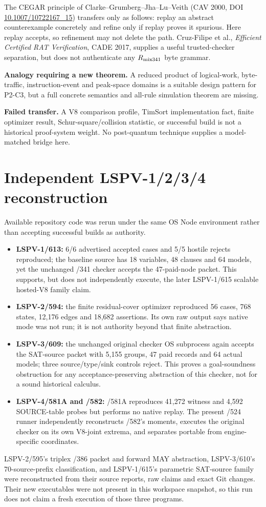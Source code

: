 \documentclass[11pt]{article}
\begin{document}
The CEGAR principle of Clarke--Grumberg--Jha--Lu--Veith (CAV 2000, DOI \href{https://doi.org/10.1007/10722167_15}{10.1007/10722167\_15}) transfers only as follows: replay an abstract counterexample concretely and refine only if replay proves it spurious.  Here replay accepts, so refinement may not delete the path.  Cruz-Filipe et al., \emph{Efficient Certified RAT Verification}, CADE 2017, supplies a useful trusted-checker separation, but does not authenticate any $R_{\rm mix341}$ byte grammar.

\textbf{Analogy requiring a new theorem.} A reduced product of logical-work, byte-traffic, instruction-event and peak-space domains is a suitable design pattern for P2-C3, but a full concrete semantics and all-rule simulation theorem are missing.

\textbf{Failed transfer.} A V8 comparison profile, TimSort implementation fact, finite optimizer result, Schur-square/collision statistic, or successful build is not a historical proof-system weight.  No post-quantum technique supplies a model-matched bridge here.

\section*{Independent LSPV-1/2/3/4 reconstruction}
Available repository code was rerun under the same OS Node environment rather than accepting successful builds as authority.
\begin{itemize}
\item \textbf{LSPV-1/613:} 6/6 advertised accepted cases and 5/5 hostile rejects reproduced; the baseline source has 18 variables, 48 clauses and 64 models, yet the unchanged /341 checker accepts the 47-paid-node packet.  This supports, but does not independently execute, the later LSPV-1/615 scalable hosted-V8 family claim.
\item \textbf{LSPV-2/594:} the finite residual-cover optimizer reproduced 56 cases, 768 states, 12,176 edges and 18,682 assertions.  Its own raw output says native mode was not run; it is not authority beyond that finite abstraction.
\item \textbf{LSPV-3/609:} the unchanged original checker OS subprocess again accepts the SAT-source packet with 5,155 groups, 47 paid records and 64 actual models; three source/type/sink controls reject.  This proves a goal-soundness obstruction for any acceptance-preserving abstraction of this checker, not for a sound historical calculus.
\item \textbf{LSPV-4/581A and /582:} /581A reproduces 41,272 witness and 4,592 SOURCE-table probes but performs no native replay.  The present /524 runner independently reconstructs /582's moments, executes the original checker on its own V8-joint extrema, and separates portable from engine-specific coordinates.
\end{itemize}
LSPV-2/595's triplex /386 packet and forward MAY abstraction, LSPV-3/610's 70-source-prefix classification, and LSPV-1/615's parametric SAT-source family were reconstructed from their source reports, raw claims and exact Git changes.  Their new executables were not present in this workspace snapshot, so this run does not claim a fresh execution of those three programs.
\end{document}
